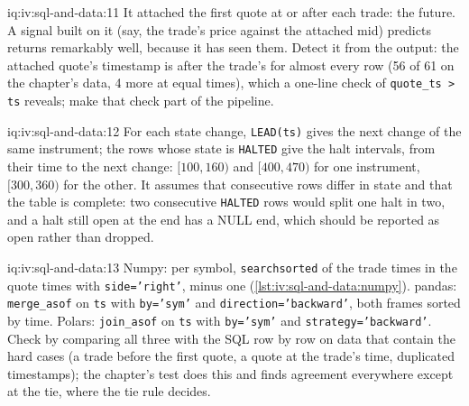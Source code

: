 \begin{solution}{iq:iv:sql-and-data:11}
It attached the first quote at or after each trade: the future. A signal built on it (say, the trade's price against the attached
mid) predicts returns remarkably well, because it has seen them. Detect it from the output: the attached quote's timestamp is after the
trade's for almost every row (56 of 61 on the chapter's data, 4 more at equal times), which a one-line check of \texttt{quote\_ts >
ts} reveals; make that check part of the pipeline.
\end{solution}

\begin{solution}{iq:iv:sql-and-data:12}
For each state change, \texttt{LEAD(ts)} gives the next change of the same instrument; the rows whose state is \texttt{HALTED} give the
halt intervals, from their time to the next change: $[100, 160)$ and $[400, 470)$ for one instrument, $[300, 360)$ for the other. It
assumes that consecutive rows differ in state and that the table is complete: two consecutive \texttt{HALTED} rows would split one
halt in two, and a halt still open at the end has a NULL end, which should be reported as open rather than dropped.
\end{solution}

\begin{solution}{iq:iv:sql-and-data:13}
Numpy: per symbol, \texttt{searchsorted} of the trade times in the quote times with \texttt{side='right'}, minus one
(\cref{lst:iv:sql-and-data:numpy}). pandas: \texttt{merge\_asof} on \texttt{ts} with \texttt{by='sym'} and
\texttt{direction='backward'}, both frames sorted by time. Polars: \texttt{join\_asof} on \texttt{ts} with \texttt{by='sym'} and
\texttt{strategy='backward'}. Check by comparing all three with the SQL row by row on
data that contain the hard cases (a trade before the first quote, a quote at the trade's time, duplicated timestamps); the
chapter's test does this and finds agreement everywhere except at the tie, where the tie rule decides.
\end{solution}

